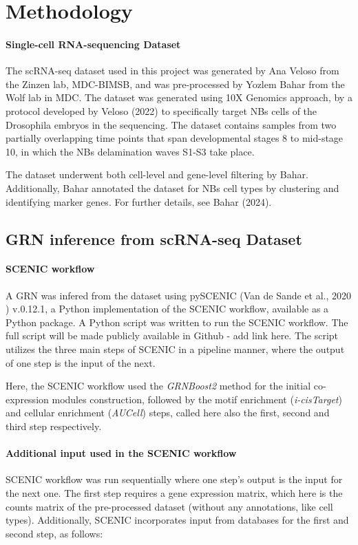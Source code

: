 \chapter{Methodology}\label{chap:Methodology}
\subsubsection{Single-cell RNA-sequencing Dataset}
The scRNA-seq dataset used in this project was generated by Ana Veloso from the Zinzen lab, MDC-BIMSB, 
and was pre-processed by Yozlem Bahar from the Wolf lab in MDC. 
The dataset was generated using 10X Genomics approach, by a protocol developed by Veloso (2022) to specifically 
target NBs cells of the Drosophila embryos in the sequencing. 
The dataset contains samples from two partially overlapping time points that span developmental stages 8 to mid-stage 10, 
in which the NBs delamination waves S1-S3 take place.

The dataset underwent both cell-level and gene-level filtering by Bahar. 
Additionally, Bahar annotated the dataset for NBs cell types by clustering and identifying marker genes. 
For further details, see Bahar (2024).

\section{GRN inference from scRNA-seq Dataset} 
\subsubsection{SCENIC workflow}
A GRN was infered from the dataset using pySCENIC 
(Van de Sande et al., 2020 \cite{van2020scalable}) v.0.12.1, a Python implementation of the SCENIC workflow, 
available as a Python package. 
A Python script was written to run the SCENIC workflow.
The full script will be made publicly available in Github - add link here. 
The script utilizes the three main steps of SCENIC in a pipeline manner, where the output of one step is the input of the next.

Here, the SCENIC workflow used the \textit{GRNBoost2} \cite{moerman2019grnboost2} method for the initial co-expression 
modules construction, followed by the motif enrichment (\textit{i-cisTarget}) and cellular enrichment (\textit{AUCell}) steps, 
called here also the first, second and third step respectively. 

\subsubsection{Additional input used in the SCENIC workflow}
SCENIC workflow was run sequentially where one step's output is the input for the next one. 
The first step requires a gene expression matrix, which here is the counts matrix of the pre-processed dataset 
(without any annotations, like cell types). 
Additionally, SCENIC incorporates input from databases for the first and second step, as follows:

